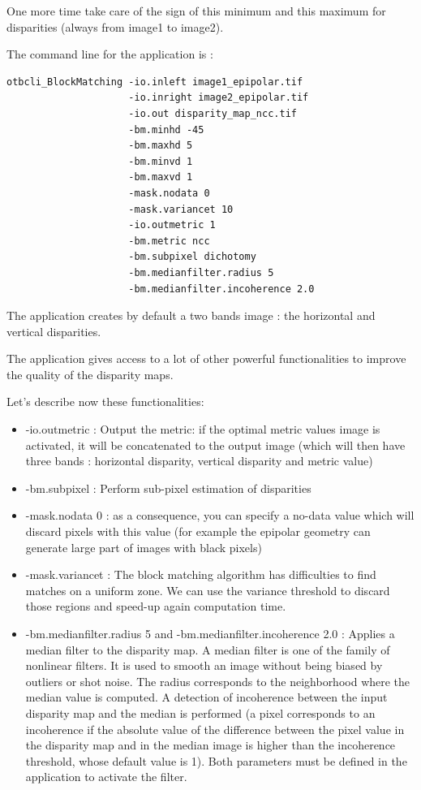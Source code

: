 One more time take care of the sign of this minimum and this maximum for
disparities (always from image1 to image2).

The command line for the  application is :
\begin{verbatim}
otbcli_BlockMatching -io.inleft image1_epipolar.tif
                     -io.inright image2_epipolar.tif
                     -io.out disparity_map_ncc.tif
                     -bm.minhd -45
                     -bm.maxhd 5
                     -bm.minvd 1
                     -bm.maxvd 1
                     -mask.nodata 0
                     -mask.variancet 10
                     -io.outmetric 1
                     -bm.metric ncc
                     -bm.subpixel dichotomy
                     -bm.medianfilter.radius 5
                     -bm.medianfilter.incoherence 2.0
\end{verbatim}

The application creates by default a two bands image : the horizontal and
vertical disparities.

The  application gives access to a lot of other
powerful functionalities to improve the quality of the disparity maps.

Let's describe now these functionalities:

\begin{itemize}
\item -io.outmetric : Output the metric: if the optimal metric values image is
  activated, it will be concatenated to the output image (which will then
  have three bands : horizontal disparity, vertical disparity and metric value)
\item -bm.subpixel : Perform sub-pixel estimation of disparities
\item -mask.nodata 0 : as a consequence, you can specify a no-data value which
  will discard pixels with this value (for example the epipolar geometry can
  generate large part of images with black pixels)
\item -mask.variancet : The block matching algorithm has difficulties to find
  matches on a uniform zone. We can use the variance threshold to discard those
  regions and speed-up again computation time.
\item -bm.medianfilter.radius 5 and -bm.medianfilter.incoherence 2.0 : Applies a
  median filter to the disparity map. A median filter is one of the family of
  nonlinear filters. It is used to smooth an image without being biased by
  outliers or shot noise. The radius corresponds to the neighborhood where the
  median value is computed. A detection of incoherence between the input
  disparity map and the median is performed (a pixel corresponds to an
  incoherence if the absolute value of the difference between the pixel value in
  the disparity map and in the median image is higher than the incoherence
  threshold, whose default value is 1). Both parameters must be defined in the
  application to activate the filter.
\end{itemize}

